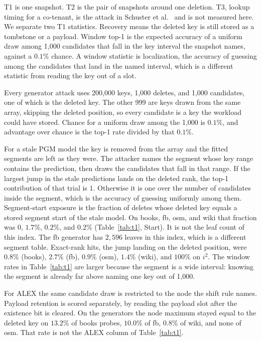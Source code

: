 \documentclass[conference]{IEEEtran}
\begin{document}
T1 is one snapshot.
T2 is the pair of snapshots around one deletion.
T3, lookup timing for a co-tenant, is the attack in Schuster et al.~\cite{schuster2025} and is not measured here.
We separate two T1 statistics.
Recovery means the deleted key is still stored as a tombstone or a payload.
Window top-1 is the expected accuracy of a uniform draw among 1{,}000 candidates that fall in the key interval the snapshot names, against a $0.1\%$ chance.
A window statistic is localization, the accuracy of guessing among the candidates that land in the named interval, which is a different statistic from reading the key out of a slot.

Every generator attack uses 200{,}000 keys, 1{,}000 deletes, and 1{,}000 candidates, one of which is the deleted key.
The other 999 are keys drawn from the same array, skipping the deleted position, so every candidate is a key the workload could have stored.
Chance for a uniform draw among the 1{,}000 is $0.1\%$, and advantage over chance is the top-1 rate divided by that $0.1\%$.

For a stale PGM model the key is removed from the array and the fitted segments are left as they were.
The attacker names the segment whose key range contains the prediction, then draws the candidates that fall in that range.
If the largest jump in the stale predictions lands on the deleted rank, the top-1 contribution of that trial is $1$.
Otherwise it is one over the number of candidates inside the segment, which is the accuracy of guessing uniformly among them.
Segment-start exposure is the fraction of deletes whose deleted key equals a stored segment start of the stale model.
On books, fb, osm, and wiki that fraction was $0$, $1.7\%$, $0.2\%$, and $0.2\%$ (Table~\ref{tab:t1}, Start).
It is not the leaf count of this index.
The fb generator has $2{,}596$ leaves in this index, which is a different segment table.
Exact-rank hits, the jump landing on the deleted position, were $0.8\%$ (books), $2.7\%$ (fb), $0.9\%$ (osm), $1.4\%$ (wiki), and $100\%$ on $i^{2}$.
The window rates in Table~\ref{tab:t1} are larger because the segment is a wide interval: knowing the segment is already far above naming one key out of 1{,}000.

For ALEX the same candidate draw is restricted to the node the shift rule names.
Payload retention is scored separately, by reading the payload slot after the existence bit is cleared.
On the generators the node maximum stayed equal to the deleted key on $13.2\%$ of books probes, $10.0\%$ of fb, $0.8\%$ of wiki, and none of osm.
That rate is not the ALEX column of Table~\ref{tab:t1}.
\end{document}
